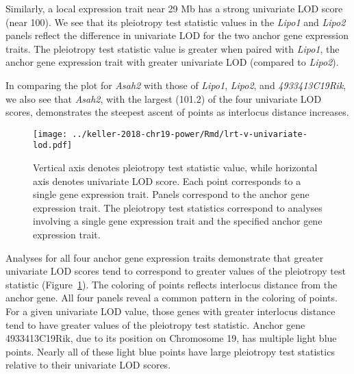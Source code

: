 \documentclass[oneside]{book}
\begin{document}
Similarly, a local expression trait near 29 Mb has a strong univariate LOD score (near 100). 
We see that its pleiotropy test statistic values in the \emph{Lipo1} and \emph{Lipo2} panels reflect the difference in univariate LOD for the two anchor gene expression traits. 
The pleiotropy test statistic value is greater when 
paired with \emph{Lipo1}, the anchor gene expression trait with greater univariate LOD (compared to \emph{Lipo2}). 

In comparing the plot for \emph{Asah2} with those of \emph{Lipo1}, \emph{Lipo2}, and \emph{4933413C19Rik}, we also see that \emph{Asah2}, with the largest (101.2) of the four univariate LOD scores, demonstrates the steepest ascent of points as interlocus distance increases. 






\begin{figure}
    \centering
    \texttt{[image: ../keller-2018-chr19-power/Rmd/lrt-v-univariate-lod.pdf]}
    \caption[Pleiotropy LRT vs. univariate LOD score plots reveal that greater univariate LOD scores (and greater interlocus distance) tend to correspond to greater pleiotropy LRT values.]{Vertical axis denotes pleiotropy test statistic value, while horizontal axis denotes univariate LOD score. Each point corresponds to a single gene expression trait. Panels correspond to the anchor gene expression trait. The pleiotropy test statistics correspond to analyses involving a single gene expression trait and the specified anchor gene expression trait.}
    \label{fig:lod}
\end{figure}

Analyses for all four anchor gene expression traits demonstrate that greater univariate LOD scores tend to correspond to greater values of the pleiotropy test statistic (Figure~\ref{fig:lod}). 
The coloring of points reflects interlocus distance from the anchor gene. 
All four panels reveal a common pattern in the coloring of points.
For a given univariate LOD value, those genes with greater interlocus distance tend to have greater values of the pleiotropy test statistic. 
Anchor gene 4933413C19Rik, due to its position on Chromosome 19, has multiple light blue points. 
Nearly all of these light blue points have large pleiotropy test statistics relative to their univariate LOD scores.
\end{document}
